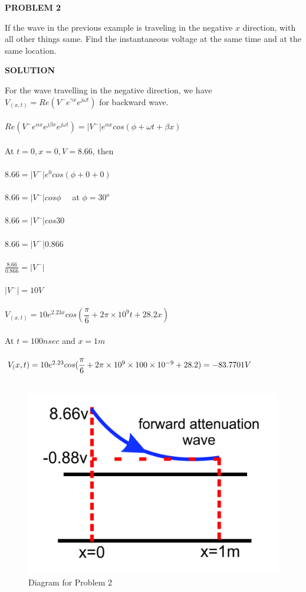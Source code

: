 \begin{center}
\textbf{PROBLEM 2}
\end{center}
If the wave in the previous example is traveling in the negative ${x}$ direction, with all other things same. Find the instantaneous  voltage at the same time and at the same location.\\
\begin{center}
\textbf{SOLUTION}
\end{center}
For the wave travelling in the negative direction, we have\\
$V_{(x,t)} = Re(V^{-}e^{\gamma x}e^{j\omega t})$ for backward wave.\\\\
$Re({V^{-}e^{\alpha x}e^{j\beta x}e^{j\omega t}}) = {|V^{-}|e^{\alpha x}cos{(\phi+\omega t + \beta x)}}$\\\\
At ${t=0, x=0, V=8.66}$, then\\\\
${8.66} = {|V^{-}|}e^{0} cos({\phi + 0 + 0})$\\\\
$8.66 = {|V^-|{cos\phi}} \quad$ at $ \phi = 30^{o} $\\\\
$8.66 = {|V^-|{cos30}}$\\\\
$8.66 = {|V^-|{0.866}}$\\\\
$\frac{8.66}{0.866} = {|V^-|}$\\\\
${|V^{-}|} = 10V$\\\\
$V_({x,t}) = 10e^{2.23x} cos({\dfrac{\pi}{6} + 2\pi\times10^9t + 28.2x})$\\\\
At ${t=100nsec}$ and ${x=1m}$\\\\
$V_({x,t}) = 10e^{2.23} cos({\dfrac{\pi}{6} + 2\pi\times10^9\times100\times10^{-9} + 28.2})\\\\
= -83.7701V$\\\\
\begin{figure}[h!]
\centering
\includegraphics[scale=0.5]{./graphics/Group98}
\caption{Diagram for Problem 2}
\end{figure}
